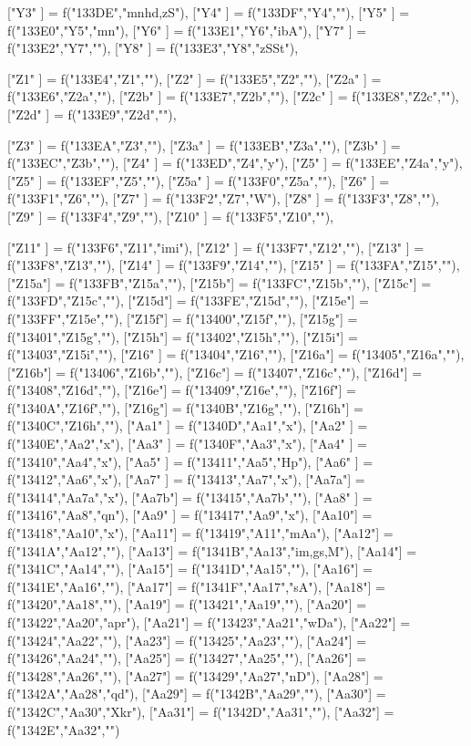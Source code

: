 {["Y3"  ]    = f("133DE","mnhd,zS"),
  ["Y4"  ]    = f("133DF","Y4",""),
["Y5"  ]    = f("133E0","Y5","mn"),
["Y6"  ]    = f("133E1","Y6","ibA"),
  ["Y7"  ]    = f("133E2","Y7",""),
["Y8"  ]    = f("133E3","Y8","zSSt"),

  ["Z1"  ]    = f("133E4","Z1",""),
  ["Z2"  ]    = f("133E5","Z2",""),
  ["Z2a" ]    = f("133E6","Z2a",""),
  ["Z2b" ]    = f("133E7","Z2b",""),
["Z2c" ]    = f("133E8","Z2c",""),
["Z2d" ]    = f("133E9","Z2d",""),

  ["Z3"  ]    = f("133EA","Z3",""),
  ["Z3a" ]    = f("133EB","Z3a",""),
["Z3b" ]    = f("133EC","Z3b",""),
["Z4"  ]    = f("133ED","Z4","y"),
["Z5"  ]    = f("133EE","Z4a","y"),
  ["Z5"  ]    = f("133EF","Z5",""),
  ["Z5a" ]    = f("133F0","Z5a",""),
  ["Z6"  ]    = f("133F1","Z6",""),
["Z7"  ]    = f("133F2","Z7","W"),
  ["Z8"  ]    = f("133F3","Z8",""),
  ["Z9"  ]    = f("133F4","Z9",""),
  ["Z10" ]    = f("133F5","Z10",""),

["Z11" ]    = f("133F6","Z11","imi"),
  ["Z12" ]    = f("133F7","Z12",""),
  ["Z13" ]    = f("133F8","Z13",""),
  ["Z14" ]    = f("133F9","Z14",""),
  ["Z15" ]    = f("133FA","Z15",""),
  ["Z15a"]    = f("133FB","Z15a",""),
  ["Z15b"]    = f("133FC","Z15b",""),
  ["Z15c"]    = f("133FD","Z15c",""),
  ["Z15d"]    = f("133FE","Z15d",""),
  ["Z15e"]    = f("133FF","Z15e",""),
  ["Z15f"]    = f("13400","Z15f",""),
  ["Z15g"]    = f("13401","Z15g",""),
  ["Z15h"]    = f("13402","Z15h",""),
["Z15i"]    = f("13403","Z15i",""),
  ["Z16" ]    = f("13404","Z16",""),
  ["Z16a"]    = f("13405","Z16a",""),
  ["Z16b"]    = f("13406","Z16b",""),
  ["Z16c"]    = f("13407","Z16c",""),
  ["Z16d"]    = f("13408","Z16d",""),
  ["Z16e"]    = f("13409","Z16e",""),
  ["Z16f"]    = f("1340A","Z16f",""),
  ["Z16g"]  = f("1340B","Z16g",""),
  ["Z16h"]  = f("1340C","Z16h",""),
["Aa1" ]  = f("1340D","Aa1","x"),
    ["Aa2" ]    = f("1340E","Aa2","x"),
["Aa3" ]    = f("1340F","Aa3","x"),
["Aa4" ]    = f("13410","Aa4","x"),
["Aa5" ]    = f("13411","Aa5","Hp"),
["Aa6" ]    = f("13412","Aa6","x"),
["Aa7" ]    = f("13413","Aa7","x"),
["Aa7a"]    = f("13414","Aa7a","x"),
["Aa7b"]    = f("13415","Aa7b",""),
["Aa8" ]    = f("13416","Aa8","qn"),
["Aa9" ]    = f("13417","Aa9","x"),
["Aa10"]    = f("13418","Aa10","x"),
["Aa11"]    = f("13419","A11","mAa"),
["Aa12"]    = f("1341A","Aa12",""),
["Aa13"]    = f("1341B","Aa13","im,gs,M"),
["Aa14"]    = f("1341C","Aa14",""),
["Aa15"]    = f("1341D","Aa15",""),
["Aa16"]    = f("1341E","Aa16",""),
["Aa17"]    = f("1341F","Aa17","sA"),
["Aa18"]    = f("13420","Aa18",""),
["Aa19"]    = f("13421","Aa19",""),
["Aa20"]    = f("13422","Aa20","apr"),
["Aa21"]    = f("13423","Aa21","wDa"),
["Aa22"]    = f("13424","Aa22",""),
["Aa23"]    = f("13425","Aa23",""),
["Aa24"]    = f("13426","Aa24",""),
["Aa25"]    = f("13427","Aa25",""),
["Aa26"]    = f("13428","Aa26",""),
["Aa27"]    = f("13429","Aa27","nD"),
["Aa28"]    = f("1342A","Aa28","qd"),
["Aa29"]    = f("1342B","Aa29",""),
    ["Aa30"]    = f("1342C","Aa30","Xkr"),
["Aa31"]    = f("1342D","Aa31",""),
["Aa32"]    = f("1342E","Aa32","")
}

